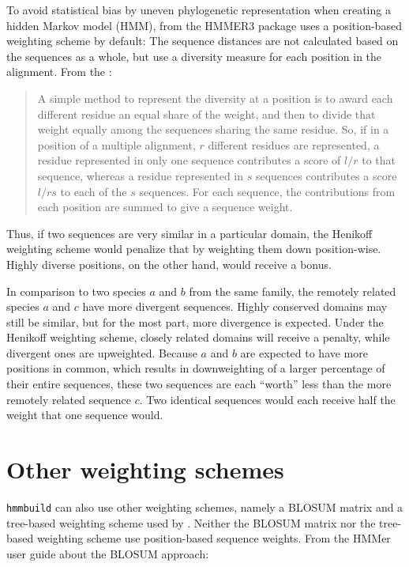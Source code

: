 \label{sec:hmmtest}
To avoid statistical bias by uneven phylogenetic representation when creating a
hidden Markov model (HMM),  from the HMMER3 package
\citep{eddy2009} uses a position-based weighting scheme by default: The sequence
distances are not calculated based on the sequences as a whole, but use a
diversity measure for each position in the alignment. From the
\citet{henikoff1994}:

\begin{quote}
	A simple method to represent the diversity at a position is to award each
	different residue an equal share of the weight, and then to divide that
	weight equally among the sequences sharing the same residue. So, if in a
	position of a multiple alignment, $r$ different residues are represented, a
	residue represented in only one sequence contributes a score of $l/r$ to that
	sequence, whereas a residue represented in $s$ sequences contributes a score
	$l/rs$ to each of the $s$ sequences. For each sequence, the contributions
	from each position are summed to give a sequence weight.
\end{quote}

Thus, if two sequences are very similar in a particular domain, the Henikoff
weighting scheme would penalize that by weighting them down position-wise.
Highly diverse positions, on the other hand, would receive a bonus. 

In comparison to two species $a$ and $b$ from the same family, the remotely
related species $a$ and $c$ have more divergent sequences. Highly conserved
domains may still be similar, but for the most part, more divergence is
expected. Under the Henikoff weighting scheme, closely related domains will
receive a penalty, while divergent ones are upweighted. Because $a$ and $b$ are
expected to have more positions in common, which results in downweighting of a
larger percentage of their entire sequences, these two sequences are each
``worth'' less than the more remotely related sequence $c$. Two identical
sequences would each receive half the weight that one sequence would.

\section*{Other weighting schemes}

\texttt{hmmbuild} can also use other weighting schemes, namely a BLOSUM matrix
and a tree-based weighting scheme used by \citet{gerstein1994}. Neither the
BLOSUM matrix nor the tree-based weighting scheme use position-based sequence
weights. From the HMMer user guide about the BLOSUM approach:


